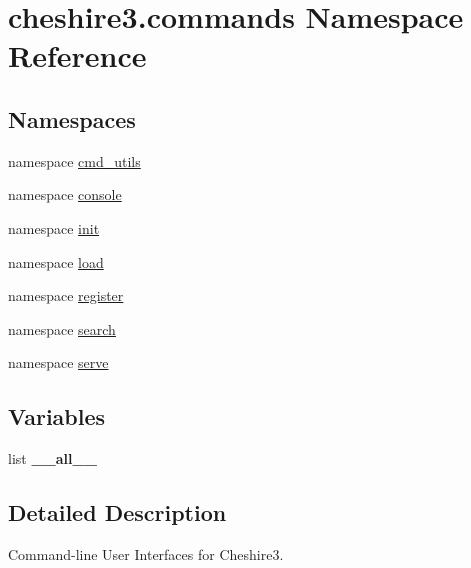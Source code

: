 \hypertarget{namespacecheshire3_1_1commands}{\section{cheshire3.\-commands Namespace Reference}
\label{namespacecheshire3_1_1commands}
}
\subsection*{Namespaces}
\begin{DoxyCompactItemize}
\item 
namespace \hyperlink{namespacecheshire3_1_1commands_1_1cmd__utils}{cmd\-\_\-utils}
\item 
namespace \hyperlink{namespacecheshire3_1_1commands_1_1console}{console}
\item 
namespace \hyperlink{namespacecheshire3_1_1commands_1_1init}{init}
\item 
namespace \hyperlink{namespacecheshire3_1_1commands_1_1load}{load}
\item 
namespace \hyperlink{namespacecheshire3_1_1commands_1_1register}{register}
\item 
namespace \hyperlink{namespacecheshire3_1_1commands_1_1search}{search}
\item 
namespace \hyperlink{namespacecheshire3_1_1commands_1_1serve}{serve}
\end{DoxyCompactItemize}
\subsection*{Variables}
\begin{DoxyCompactItemize}
\item 
list {\bfseries \-\_\-\-\_\-all\-\_\-\-\_\-}
\end{DoxyCompactItemize}


\subsection{Detailed Description}
\begin{DoxyVerb}Command-line User Interfaces for Cheshire3.\end{DoxyVerb}
 

